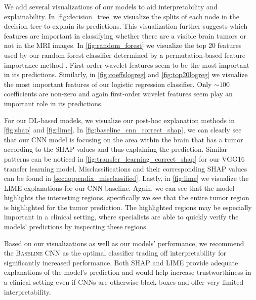 We add several visualizations of our models to aid interpretability and explainability. In \autoref{fig:decision_tree} we visualize the splits of each node in the decision tree to explain its predictions. This visualization further suggests which features are important in classifying whether there are a visible brain tumors or not in the MRI images. In \autoref{fig:random_forest} we visualize the top 20 features used by our random forest classifier determined by a permutation-based feature importance method \citep{breiman2001random}. First-order wavelet features seem to be the most important in its predictions. Similarly, in \autoref{fig:coeffslogreg} and \autoref{fig:top20logreg} we visualize the most important features of our logistic regression classifier. Only $\sim100$ coefficients are non-zero and again first-order wavelet features seem play an important role in its predictions.

For our DL-based models, we visualize our post-hoc explanation methods in \autoref{fig:shap} and \autoref{fig:lime}. In \autoref{fig:baseline_cnn_correct_shap}, we can clearly see that our CNN model is focusing on the area within the brain that has a tumor according to the SHAP values and thus explaining the prediction. Similar patterns can be noticed in \autoref{fig:transfer_learning_correct_shap} for our VGG16 transfer learning model. Misclassifications and their corresponding SHAP values can be found in \autoref{sec:appendix_misclassified}. Lastly, in \autoref{fig:lime} we visualize the LIME explanations for our CNN baseline. Again, we can see that the model highlights the interesting regions, specifically we see that the entire tumor region is highlighted for the tumor prediction. The highlighted regions may be especially important in a clinical setting, where specialists are able to quickly verify the models' predictions by inspecting these regions.

Based on our visualizations as well as our models' performance, we recommend the \textsc{Baseline CNN} as the optimal classifier trading off interpretability for significantly increased performance. Both SHAP and LIME provide adequate explanations of the model's prediction and would help increase trustworthiness in a clinical setting even if CNNs are otherwise black boxes and offer very limited interpretability.
